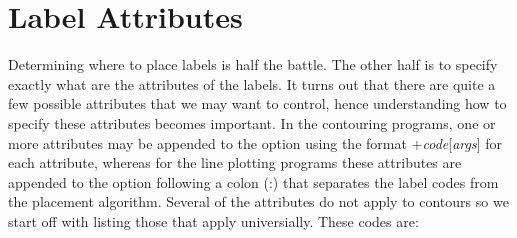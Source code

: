 \section{Label Attributes}
Determining where to place labels is half the battle.  The other half is to specify exactly
what are the attributes of the labels.  It turns out that there are quite a few possible
attributes that we may want to control, hence understanding how to specify these attributes
becomes important.  In the contouring programs, one or more attributes may be appended to the
 option using the format +{\it code}[{\it args}] for each attribute, whereas for the line
plotting programs these attributes are appended to the  option following a colon (:)
that separates the label codes from the placement algorithm.  Several of the attributes do not
apply to contours so we start off with listing those that apply universially.  These codes are:

